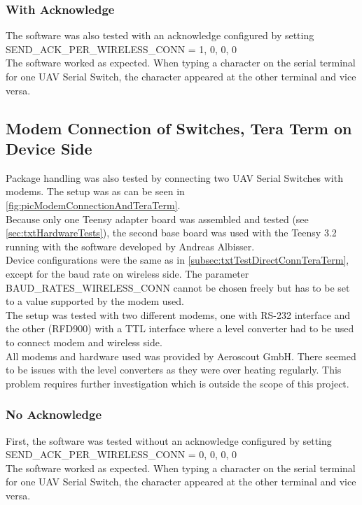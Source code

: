 \subsubsection{With Acknowledge}
The software was also tested with an acknowledge configured by setting SEND\_ACK\_PER\_WIRELESS\_CONN = 1, 0, 0, 0\\
The software worked as expected. When typing a character on the serial terminal for one UAV Serial Switch, the character appeared at the other terminal and vice versa.
%
%
\subsection{Modem Connection of Switches, Tera Term on Device Side} 
%
Package handling was also tested by connecting two UAV Serial Switches with modems. The setup was as can be seen in \autoref{fig:picModemConnectionAndTeraTerm}.\\
Because only one Teensy adapter board was assembled and tested (see \autoref{sec:txtHardwareTests}), the second base board was used with the Teensy 3.2 running with the software developed by Andreas Albisser.\\
Device configurations were the same as in \autoref{subsec:txtTestDirectConnTeraTerm}, except for the baud rate on wireless side. The parameter BAUD\_RATES\_WIRELESS\_CONN cannot be chosen freely but has to be set to a value supported by the modem used.\\
The setup was tested with two different modems, one with RS-232 interface and the other (RFD900) with a TTL interface where a level converter had to be used to connect modem and wireless side.\\
All modems and hardware used was provided by Aeroscout GmbH. There seemed to be issues with the level converters as they were over heating regularly. This problem  requires further investigation which is outside the scope of this project.
%
\subsubsection{No Acknowledge}
First, the software was tested without an acknowledge configured by setting SEND\_ACK\_PER\_WIRELESS\_CONN = 0, 0, 0, 0\\
The software worked as expected. When typing a character on the serial terminal for one UAV Serial Switch, the character appeared at the other terminal and vice versa.
%
